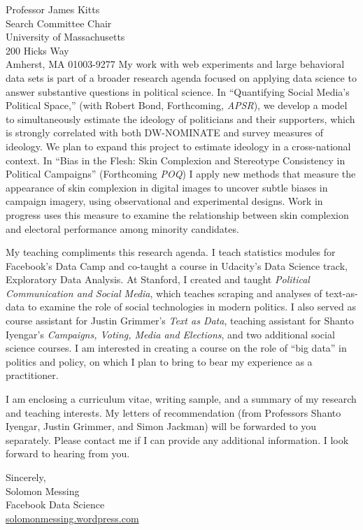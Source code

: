 \documentclass[fontsize=12pt, paper=a4]{scrlttr2}
\begin{document}
\begin{letter}{Professor James Kitts\\
Search Committee Chair\\
University of Massachusetts\\
200 Hicks Way\\
Amherst, MA 01003-9277}
My work with web experiments and large behavioral data sets is part of a broader research agenda focused on applying data science to answer substantive questions in political science.  In ``Quantifying Social Media's Political Space,'' (with Robert Bond, Forthcoming, \emph{APSR}), we develop a model to simultaneously estimate the ideology of politicians and their supporters, which is strongly correlated with both DW-NOMINATE and survey measures of ideology.  We plan to expand this project to estimate ideology in a cross-national context.  In ``Bias in the Flesh: Skin Complexion and Stereotype Consistency in Political Campaigns'' (Forthcoming \emph{POQ}) I apply new methods that measure the appearance of skin complexion in digital images to uncover subtle biases in campaign imagery, using observational and experimental designs.  Work in progress uses this measure to examine the relationship between skin complexion and electoral performance among minority candidates.  

My teaching compliments this research agenda.  I teach statistics modules for Facebook's Data Camp and co-taught a course in Udacity's Data Science track, Exploratory Data Analysis.  At Stanford, I created and taught \emph{Political Communication and Social Media}, which teaches scraping and analyses of text-as-data to examine the role of social technologies in modern politics.  I also served as course assistant for Justin Grimmer's \emph{Text as Data}, teaching assistant for Shanto Iyengar's \emph{Campaigns, Voting, Media and Elections}, and two additional social science courses.  I am interested in creating a course on the role of ``big data'' in politics and policy, on which I plan to bring to bear my experience as a practitioner.  

I am enclosing a curriculum vitae, writing sample, and a summary of my research and teaching interests. My letters of recommendation (from Professors Shanto Iyengar, Justin Grimmer, and Simon Jackman) will be forwarded to you separately. Please contact me if I can provide any additional information. I look forward to hearing from you.

\enlargethispage{6\baselineskip}

\closing{
Sincerely, \\
Solomon Messing\\
Facebook Data Science \\
 \url{solomonmessing.wordpress.com}
}

\end{letter}

%
%
\end{document}
